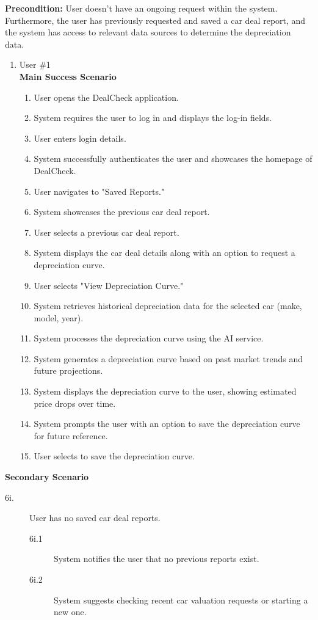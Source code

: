 \documentclass[]{article}
\begin{document}
\begin{enumerate}[{\bf {BE}1.}]
{\bf Precondition:} User doesn't have an ongoing request within the system. Furthermore, the user has previously requested and saved a car deal report, and the system 
	has access to relevant data sources to determine the depreciation data.
	\begin{enumerate}[{\bf VP1.}]
		\item User \#1 \\
		{\bf Main Success Scenario}
		\begin{enumerate}[1.]
			\item User opens the DealCheck application.
			\item System requires the user to log in and displays the log-in fields.
			\item User enters login details.
			\item System successfully authenticates the user and showcases the homepage of DealCheck.
			\item User navigates to "Saved Reports."
			\item System showcases the previous car deal report.
			\item User selects a previous car deal report.
			\item System displays the car deal details along with an option to request a depreciation curve.
			\item User selects "View Depreciation Curve."
			\item System retrieves historical depreciation data for the selected car (make, model, year).
			\item System processes the depreciation curve using the AI service.
			\item System generates a depreciation curve based on past market trends and future projections.
			\item System displays the depreciation curve to the user, showing estimated price drops over time.
			\item System prompts the user with an option to save the depreciation curve for future reference.
			\item User selects to save the depreciation curve.
		\end{enumerate}
	\end{enumerate}
		{\bf Secondary Scenario}
		\begin{description}
			\item[6i.] User has no saved car deal reports.
			\begin{description}
				\item[6i.1] System notifies the user that no previous reports exist.
				\item[6i.2] System suggests checking recent car valuation requests or starting a new one.
			\end{description}
			

\end{description}
\end{enumerate}
\end{document}
